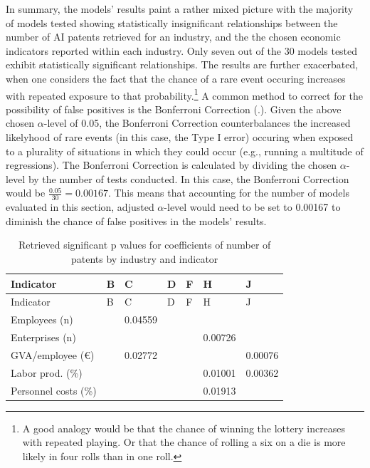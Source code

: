\documentclass[
  11,
  a4paperpaper,
]{article}
\begin{document}
In summary, the models' results paint a rather mixed picture with the
majority of models tested showing statistically insignificant
relationships between the number of AI patents retrieved for an
industry, and the the chosen economic indicators reported within each
industry. Only seven out of the 30 models tested exhibit statistically
significant relationships. The results are further exacerbated, when one
considers the fact that the chance of a rare event occuring increases
with repeated exposure to that probability.\footnote{A good analogy
  would be that the chance of winning the lottery increases with
  repeated playing. Or that the chance of rolling a six on a die is more
  likely in four rolls than in one roll.} A common method to correct for
the possibility of false positives is the Bonferroni Correction
(.). Given the above chosen \(\alpha\)-level of 0.05, the
Bonferroni Correction counterbalances the increased likelyhood of rare
events (in this case, the Type I error) occuring when exposed to a
plurality of situations in which they could occur (e.g., running a
multitude of regressions). The Bonferroni Correction is calculated by
dividing the chosen \(\alpha\)-level by the number of tests conducted.
In this case, the Bonferroni Correction would be
\(\frac{0.05}{30}=0.00167\). This means that accounting for the number
of models evaluated in this section, adjusted \(\alpha\)-level would
need to be set to 0.00167 to diminish the chance of false positives in
the models' results.


\label{tbl-pvalues}
\begin{longtable}[]{@{}lllllll@{}}
\caption{\label{tbl-pvalues}Retrieved significant p values for
coefficients of number of patents by industry and
indicator}\tabularnewline
\toprule\noalign{}
Indicator & B & C & D & F & H & J \\
\midrule\noalign{}
\endfirsthead
\toprule\noalign{}
Indicator & B & C & D & F & H & J \\
\midrule\noalign{}
\endhead
\bottomrule\noalign{}
\endlastfoot
Employees (n) & & 0.04559 & & & & \\
Enterprises (n) & & & & & 0.00726 & \\
GVA/employee (€) & & 0.02772 & & & & 0.00076 \\
Labor prod. (\%) & & & & & 0.01001 & 0.00362 \\
Personnel costs (\%) & & & & & 0.01913 & \\
\end{longtable}
\end{document}
